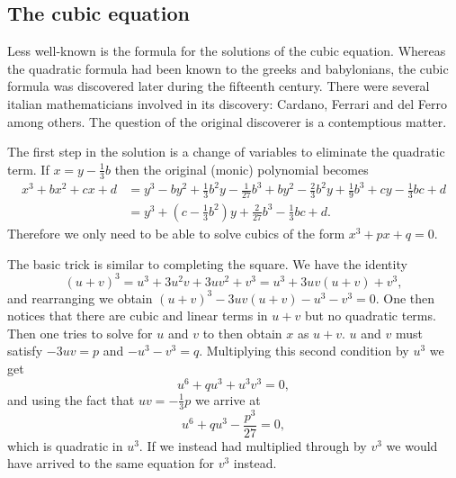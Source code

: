 \documentclass[12pt,oneside]{book}
\numberwithin{table}{section}
\numberwithin{equation}{section}
\numberwithin{figure}{section}
\begin{document}
\subsection{The cubic equation}
Less well-known is the formula for the solutions of the cubic equation. Whereas the quadratic formula had been known to the greeks and babylonians, the cubic formula was discovered later during the fifteenth century. There were several italian mathematicians involved in its discovery: Cardano, Ferrari and del Ferro among others. The question of the original discoverer is a contemptious matter. 

The first step in the solution is a change of variables to eliminate the quadratic term. If \( x = y - \frac{1}{3}b \) then the original (monic) polynomial becomes
\begin{align*}
	x^3 + bx^2 + cx + d &= y^3 - by^2 + \frac{1}{3}b^2 y - \frac{1}{27}b^3 + by^2 - \frac{2}{3}b^2y + \frac{1}{9}b^3 + cy - \frac{1}{3}bc + d \\
											&= y^3 + \left(c - \frac{1}{3}b^2 \right)y + \frac{2}{27}b^3 - \frac{1}{3}bc + d.
\end{align*}
Therefore we only need to be able to solve cubics of the form \( x^3 + px + q = 0 \). 

The basic trick is similar to completing the square. We have the identity
\begin{equation*}
	(u+v)^3 = u^3 + 3u^2v + 3uv^2 + v^3 = u^3 + 3uv(u+v) + v^3,
\end{equation*}
and rearranging we obtain \( (u+v)^3 - 3uv(u+v) - u^3 - v^3 = 0 \). One then notices that there are cubic and linear terms in \( u+v \) but no quadratic terms. Then one tries to solve for \( u \) and \( v \) to then obtain \( x \) as \( u+v \). \( u \) and \( v \) must satisfy \( -3uv = p \) and \( -u^3 - v^3 = q \). Multiplying this second condition by \( u^3 \) we get
\begin{equation*}
	u^6 + qu^3 + u^3v^3 = 0,
\end{equation*}
and using the fact that \( uv = -\frac{1}{3}p \) we arrive at
\begin{equation*}
	u^6 + qu^3 - \frac{p^3}{27} = 0,
\end{equation*}
which is quadratic in \( u^3 \). If we instead had multiplied through by \( v^3 \) we would have arrived to the same equation for \( v^3 \) instead.
\end{document}
